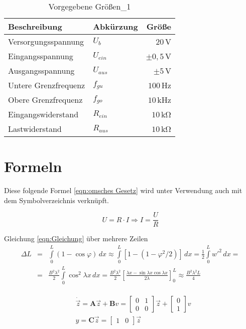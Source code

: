 \begin{table}[htp]
	\centering
	\caption[Vorgegebene Größen\_1]{Vorgegebene Größen\_1}
	\label{tab: Vorgegebene Größen_1}
	\footnotesize
		\begin{tabular}{l l r}
			\toprule
			Beschreibung & Abkürzung & Größe \\
			\midrule
			Versorgungsspannung & $U_b$ & $20$\,\si{\volt}\\
			Eingangsspannung & $U_{ein}$ & $\pm0,5$\,\si{\volt}\\
			Ausgangsspannung & $U_{aus}$ & $\pm5$\,\si{\volt}\\
			Untere Grenzfrequenz & $f_{gu}$ & $100$\,\si{\hertz}\\
			Obere Grenzfrequenz & $f_{go}$ & $10$\,\si{\kilo\hertz}\\
			Eingangswiderstand & $R_{ein}$ & $10$\,\si{\kilo\ohm}\\
			Lastwiderstand & $R_{aus}$ & $10$\,\si{\kilo\ohm}\\
			\bottomrule
		\end{tabular}
\end{table}

\section{Formeln}

Diese folgende Formel \ref{eqn:omsches Gesetz} wird unter Verwendung auch mit dem Symbolverzeichnis verknüpft. 


\begin{equation}
	{U}={R}\cdot{I}
	\Rightarrow
	{I}=\frac{U}{R}
	\label{eqn:omsches Gesetz}
\end{equation} 

Gleichung \cref{eqn:Gleichung} über mehrere Zeilen
\begin{eqnarray}
	\Delta L&=&\int\limits_0^L(1-\cos\varphi)\,dx\approx\int\limits_0^L[1-(1-\varphi^2/2)]\,dx=\frac{1}{2}\int\limits_0^Lw'^2\,dx=\nonumber\\
	&=&\frac{B^2\lambda^2}{2}\int\limits_0^L\cos^2\lambda x\,dx=\frac{B^2\lambda^2}{2}\left[\frac{\lambda x-\sin\lambda x\cos\lambda x}{2\lambda}\right]_0^L\approx\frac{B^2\lambda^2L}{4}
	\label{eqn:Gleichung}
\end{eqnarray}

\begin{align}
	\begin{split}
		&\dot{\Vec{z}} = \boldsymbol{A}\Vec{z}+ \boldsymbol{B}v = \begin{bmatrix} 0 & 1 \\ 0 & 0 \end{bmatrix} \Vec{z}+\begin{bmatrix} 0 \\ 1\end{bmatrix} v \\
		&y = \boldsymbol{C}\Vec{z} = \begin{bmatrix}1 & 0\end{bmatrix} \Vec{z} \\
	\end{split}
	\label{eqn:statelin}
\end{align}



